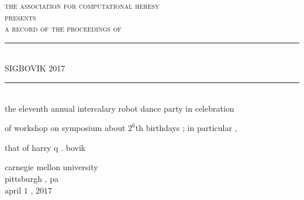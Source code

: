 \documentclass{article}
\begin{document}
\setmainfont{Splotch.ttf}
\setsansfont{Birbaslo.ttf}

\newcommand{\HRule}{\rule{\linewidth}{0.5mm}}

\begin{titlepage}
\begin{center}

\textsc{\LARGE the association for computational heresy}\\[0.5cm]

\textsc{\large presents}\\[1cm]

\textsc{\Large a record of the proceedings of}\\[0.5cm]
\HRule \\[0.4cm]
{ \Huge \sf SIGBOVIK 2017 \\[0.4cm] }

\HRule \\[2cm]


the eleventh annual intercalary robot dance party in celebration

of workshop on symposium about $2^6$th birthdays{ ;} in particular{ ,}

that of harry q{ .} bovik

\vfill

{\Large carnegie mellon university\\[0.25cm]
pittsburgh{ ,} pa\\[0.3cm]
april $1${ ,} $2017$}

\end{center}
\end{titlepage}
\end{document}
